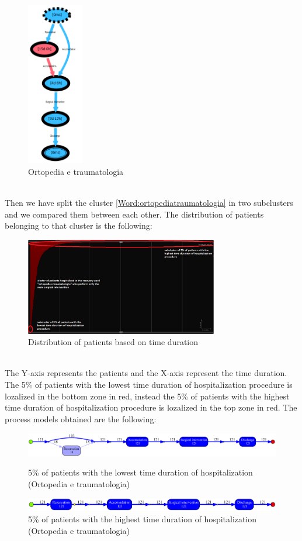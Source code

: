 \begin{figure} [htbp]
\includegraphics[width=0.22\textwidth]{RicoveriTransitionSystemSojourn3601}
\caption{Ortopedia e traumatologia}
\end{figure}\\
Then we have split the cluster \ref{Word:ortopediatraumatologia} in two subclusters and we compared them between each other. The distribution of patients belonging to that cluster is the following:
\begin{figure} [htbp]
\includegraphics[width=0.75\textwidth]{RicoveriChart3}
\caption{Distribution of patients based on time duration}
\end{figure}\\
The Y-axis represents the patients and the X-axis represent the time duration. The 5\% of patients with the lowest time duration of hospitalization procedure is lozalized in the bottom zone in red, instead the 5\% of patients with the highest time duration of hospitalization procedure is lozalized in the top zone in red. 
\clearpage
\noindent
The process models obtained are the following:
\begin{figure} [htbp]
\includegraphics[width=\textwidth]{RicoveriInductiveVisualMiner3601Fast}
\caption{5\% of patients with the lowest time duration of hospitalization (Ortopedia e traumatologia)}
\includegraphics[width=\textwidth]{RicoveriInductiveVisualMiner3601Slow}
\caption{5\% of patients with the highest time duration of hospitalization (Ortopedia e traumatologia)}
\end{figure}\\
